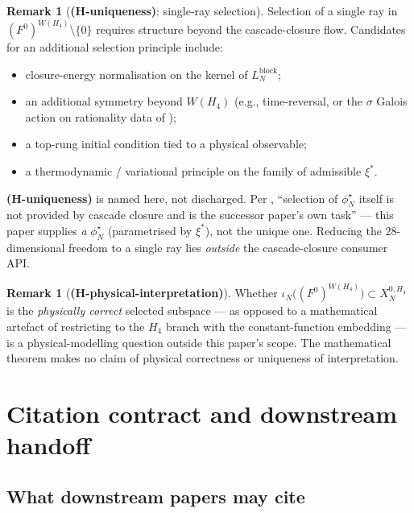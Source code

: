 \documentclass[11pt]{article}
\theoremstyle{definition}
\newtheorem{remark}[theorem]{Remark}
\begin{document}
\begin{remark}[\textbf{(H-uniqueness)}: single-ray selection]
\label{rmk:H-uniqueness}
Selection of a single ray in $(F^0)^{W(H_4)} \setminus \{0\}$
requires structure beyond the cascade-closure flow. Candidates
for an additional selection principle include:
\begin{itemize}
\item closure-energy normalisation on the kernel of
  $L_N^{\mathrm{block}}$;
\item an additional symmetry beyond $W(H_4)$ (e.g.,
  time-reversal, or the $\sigma$ Galois action on rationality
  data of \cite[Definition~\texttt{def:sigma}]{RefinementSpaces});
\item a top-rung initial condition tied to a physical observable;
\item a thermodynamic / variational principle on the family of
  admissible $\xi^{*}$.
\end{itemize}
\textbf{(H-uniqueness)} is named here, not discharged. Per
\cite[\S 3.4 lines 637--639]{CascadeMechanism}, ``selection of
$\phi^{\star}_{N}$ itself is not provided by cascade closure and
is the successor paper's own task'' --- this paper supplies
\emph{a} $\phi^{\star}_{N}$ (parametrised by $\xi^{*}$), not
the unique one. Reducing the $28$-dimensional freedom to a single ray
lies \emph{outside} the cascade-closure consumer API.
\end{remark}

\begin{remark}[\textbf{(H-physical-interpretation)}]
\label{rmk:H-phys}
Whether $\iota_N\bigl((F^0)^{W(H_4)}\bigr) \subset X_N^{0, H_4}$
is the \emph{physically correct} selected subspace --- as opposed
to a mathematical artefact of restricting to the $H_4$ branch
with the constant-function embedding --- is a physical-modelling
question outside this paper's scope. The mathematical theorem
makes no claim of physical correctness or uniqueness of
interpretation.
\end{remark}

\section{Citation contract and downstream handoff}
\label{sec:handoff}

\subsection{What downstream papers may cite}
\end{document}
